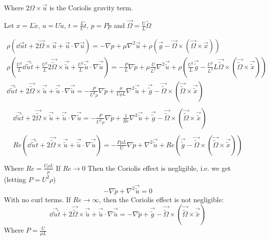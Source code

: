 \documentclass{X:/Documents/Coding/Latex/myassignment}
\begin{document}
\begin{enumerate}
	Where $2\Omega \times \vec u$ is the Coriolis gravity term.

	Let $x = L\tilde{x}$, $u = U\tilde{u}$, $t = \frac{L}{U}\tilde{t}$, $p = P\tilde{p}$ and
	$\vec \Omega = \frac{U}{L} \tilde{\Omega}$


	\begin{align*}	
		\rho \left(\dd{\vec u}{t} +  2\vec \Omega \times \vec u + \vec u \cdot \nabla \vec u\right) = - \nabla p + \mu \nabla^2 \vec u + \rho(\vec g - \vec \Omega \times (\vec\Omega \times \vec x))\\
		\rho \left(\frac{U^2}{L}\dd{\vec{\tilde{u}}}{\tilde{t}} + \frac{U^2}{L} 2\vec{\tilde{\Omega}} \times \vec{\tilde{u}} + \frac{U^2}{L}\vec{\tilde{u}} \cdot \nabla \vec{\tilde{u}}\right) = -\frac{P}{L} \nabla \tilde{p} + \mu \frac{U}{L^2} \nabla^2 \vec{\tilde{u}} + \rho(\frac{U^2}{L}\vec{\tilde{g}} - \frac{U^2}{L^2} L\vec{\tilde{\Omega}} \times (\vec{\tilde{\Omega}} \times \vec{\tilde{x}}))\\
		\dd{\vec{\tilde{u}}}{\tilde{t}} +2\vec{\tilde{\Omega}} \times \vec{\tilde{u}} + \vec{\tilde{u}} \cdot \nabla \vec{\tilde{u}} = -\frac{P}{U^2 \rho} \nabla \tilde{p} + \frac{\mu}{U\rho L}  \nabla^2 \vec{\tilde{u}} + \vec{\tilde{g}} - \vec{\tilde{\Omega}} \times (\vec{\tilde{\Omega}} \times \vec{\tilde{x}})\\
	\end{align*}
	\begin{align*}		
		\dd{\vec{\tilde{u}}}{\tilde{t}} +2\vec{\tilde{\Omega}} \times \vec{\tilde{u}} + \vec{\tilde{u}} \cdot \nabla \vec{\tilde{u}} = -\frac{P}{U^2 \rho} \nabla \tilde{p} + \frac{1}{Re}  \nabla^2 \vec{\tilde{u}} + \vec{\tilde{g}} - \vec{\tilde{\Omega}} \times (\vec{\tilde{\Omega}} \times \vec{\tilde{x}})\\\\
		Re(\dd{\vec{\tilde{u}}}{\tilde{t}} +2\vec{\tilde{\Omega}} \times \vec{\tilde{u}} + \vec{\tilde{u}} \cdot \nabla \vec{\tilde{u}}) = -\frac{P\mu L}{U } \nabla \tilde{p} +  \nabla^2 \vec{\tilde{u}} + Re(\vec{\tilde{g}} - \vec{\tilde{\Omega}} \times (\vec{\tilde{\Omega}} \times \vec{\tilde{x}}))\\\\
	\end{align*}
	Where $Re = \frac{U\rho L}{\mu}$
	If $Re \to 0$ Then the Coriolis effect is negligible, i.e. we get (letting $P = U^2\rho$)
	\[-\nabla \tilde{p} +  \nabla^2 \vec{\tilde{u}} = 0\]
	With no curl terms.
	If $Re \to \infty$, then the Coriolis effect is not negligible:
	\[\dd{\vec{\tilde{u}}}{\tilde{t}} +2\vec{\tilde{\Omega}} \times \vec{\tilde{u}} + \vec{\tilde{u}} \cdot \nabla \vec{\tilde{u}} = -\nabla \tilde{p} + \vec{\tilde{g}} - \vec{\tilde{\Omega}} \times (\vec{\tilde{\Omega}} \times \vec{\tilde{x}})\]
	Where $P = \frac{U}{\mu L}$


\end{enumerate}
\end{document}
